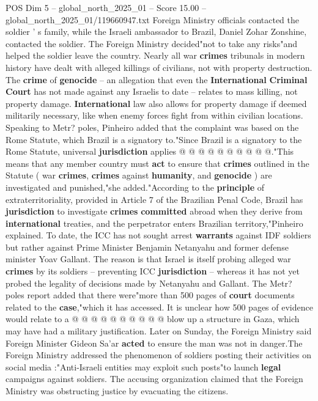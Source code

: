 \begin{textsample}{POS Dim 5 – global\_north\_2025\_01 – Score 15.00 – global\_north\_2025\_01/119660947.txt}
Foreign Ministry officials contacted the soldier ' s family, while the Israeli ambassador to Brazil, Daniel Zohar Zonshine, contacted the soldier.
The Foreign Ministry decided"not to take any risks"and helped the soldier leave the country.
Nearly all war \textbf{crimes} tribunals in modern history have dealt with alleged killings of civilians, not with property destruction.
The \textbf{crime} of \textbf{genocide} -- an allegation that even the \textbf{International} \textbf{Criminal} \textbf{Court} has not made against any Israelis to date -- relates to mass killing, not property damage. \textbf{International} law also allows for property damage if deemed militarily necessary, like when enemy forces fight from within civilian locations.
Speaking to Metr? poles, Pinheiro added that the complaint was based on the Rome Statute, which Brazil is a signatory to."Since Brazil is a signatory to the Rome Statute, universal \textbf{jurisdiction} applies @ @ @ @ @ @ @ @ @ @."This means that any member country must \textbf{act} to ensure that \textbf{crimes} outlined in the Statute ( war \textbf{crimes}, \textbf{crimes} against \textbf{humanity}, and \textbf{genocide} ) are investigated and punished,"she added."According to the \textbf{principle} of extraterritoriality, provided in Article 7 of the Brazilian Penal Code, Brazil has \textbf{jurisdiction} to investigate \textbf{crimes} \textbf{committed} abroad when they derive from \textbf{international} treaties, and the perpetrator enters Brazilian territory,"Pinheiro explained.
To date, the ICC has not sought arrest \textbf{warrants} against IDF soldiers but rather against Prime Minister Benjamin Netanyahu and former defense minister Yoav Gallant.
The reason is that Israel is itself probing alleged war \textbf{crimes} by its soldiers -- preventing ICC \textbf{jurisdiction} -- whereas it has not yet probed the legality of decisions made by Netanyahu and Gallant.
The Metr? poles report added that there were"more than 500 pages of \textbf{court} documents related to the \textbf{case},"which it has accessed.
It is unclear how 500 pages of evidence would relate to a @ @ @ @ @ @ @ @ @ @ blow up a structure in Gaza, which may have had a military justification.
Later on Sunday, the Foreign Ministry said Foreign Minister Gideon Sa'ar \textbf{acted} to ensure the man was not in danger.The Foreign Ministry addressed the phenomenon of soldiers posting their activities on social media :"Anti-Israeli entities may exploit such posts"to launch \textbf{legal} campaigns against soldiers.
The accusing organization claimed that the Foreign Ministry was obstructing justice by evacuating the citizens.

\end{textsample}
